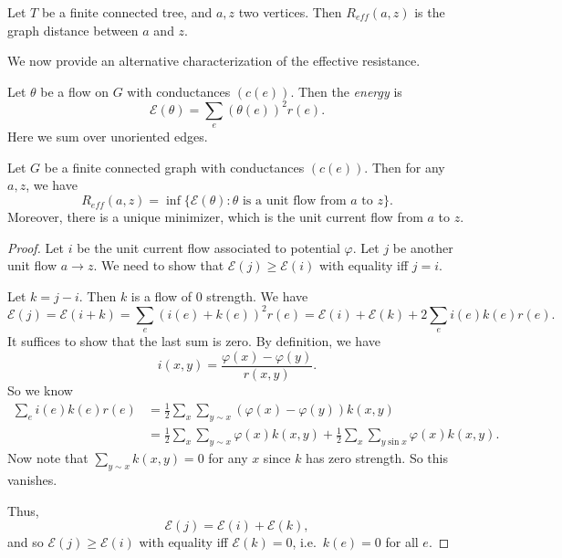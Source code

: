 \documentclass[a4paper]{article}
\begin{document}
\begin{ex}
  Let $T$ be a finite connected tree, and $a, z$ two vertices. Then $R_{eff}(a, z)$ is the graph distance between $a$ and $z$.
\end{ex}

We now provide an alternative characterization of the effective resistance.

\begin{defi}[Energy]
  Let $\theta$ be a flow on $G$ with conductances $(c(e))$. Then the \emph{energy} is
  \[
    \mathcal{E}(\theta) = \sum_e (\theta(e))^2 r(e).
  \]
  Here we sum over unoriented edges.
\end{defi}

\begin{thm}
  Let $G$ be a finite connected graph with conductances $(c(e))$. Then for any $a, z$, we have
  \[
    R_{eff}(a, z) = \inf \{\mathcal{E}(\theta): \text{$\theta$ is a unit flow from $a$ to $z$}\}.
  \]
  Moreover, there is a unique minimizer, which is the unit current flow from $a$ to $z$.
\end{thm}

\begin{proof}
  Let $i$ be the unit current flow associated to potential $\varphi$. Let $j$ be another unit flow $a \to z$. We need to show that $\mathcal{E}(j) \geq \mathcal{E}(i)$ with equality iff $j = i$.

  Let $k = j - i$. Then $k$ is a flow of $0$ strength. We have
  \[
    \mathcal{E}(j) = \mathcal{E}(i + k) = \sum_e (i(e) + k(e))^2 r(e) = \mathcal{E}(i) + \mathcal{E}(k) + 2 \sum_e i(e) k(e) r(e).
  \]
  It suffices to show that the last sum is zero. By definition, we have
  \[
    i(x, y) = \frac{\varphi(x) - \varphi(y)}{r(x, y)}.
  \]
  So we know
  \begin{align*}
    \sum_e i(e) k(e) r(e) &= \frac{1}{2} \sum_x \sum_{y \sim x} (\varphi(x) - \varphi(y)) k(x, y)\\
    &= \frac{1}{2} \sum_x \sum_{y \sim x} \varphi(x)k(x, y) + \frac{1}{2} \sum_x \sum_{y \sin x} \varphi(x) k(x, y).
  \end{align*}
  Now note that $\sum_{y \sim x} k(x, y) = 0$ for any $x$ since $k$ has zero strength. So this vanishes.

  Thus,
  \[
    \mathcal{E}(j) = \mathcal{E}(i) + \mathcal{E}(k),
  \]
  and so $\mathcal{E}(j) \geq \mathcal{E}(i)$ with equality iff $\mathcal{E}(k) = 0$, i.e.\ $k(e) = 0$ for all $e$.
\end{proof}
\end{document}
